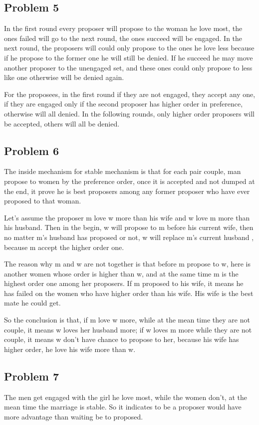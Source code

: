 \documentclass{article}
\begin{document}
\subsection{Problem 5}
\indent \par In the first round every proposer will propose to the woman he love most, the ones failed will go to the next round, the ones succeed will be engaged. In the next round, the proposers will could only propose to the ones he love less because if he propose to the former one he will still be denied. If he succeed he may move another proposer to the unengaged set, and these ones could only propose to less like one otherwise will be denied again.
\indent \par For the proposees, in the first round if they are not engaged, they accept any one, if they are engaged only if the second proposer has higher order in preference, otherwise will all denied. In the following rounds, only higher order proposers will be accepted, others will all be denied.
\subsection{Problem 6}
\indent \par The inside mechanism for stable mechanism is that for each pair couple, man propose to women by the preference order, once it is accepted and not dumped at the end, it prove he is best proposers among any former proposer who have ever proposed to that woman.
\indent \par Let's assume the proposer m love w more than his wife and w love m more than his husband. Then in the begin, w will propose to m before his current wife, then no matter m's husband has proposed or not, w will replace m's current husband , because m accept the higher order one.
\indent \par The reason why m and w are not together is that before m propose to w, here is another women whose order is higher than w, and at the same time m is the highest order one among her proposers. If m proposed to his wife, it means he has failed on the women who have higher order than his wife. His wife is the best mate he could get. 
\indent \par So the conclusion is that, if m love w more, while at the mean time they are not couple, it means w loves her husband more; if w loves m more while they are not couple, it means w don't have chance to propose to her, because his wife has  higher order, he love his wife more than w.
\subsection{Problem 7}
\indent The men get engaged with the girl he love most, while the women don't, at the mean time the marriage is stable. So it indicates to be a proposer would have more advantage than waiting be to proposed.
\end{document}
